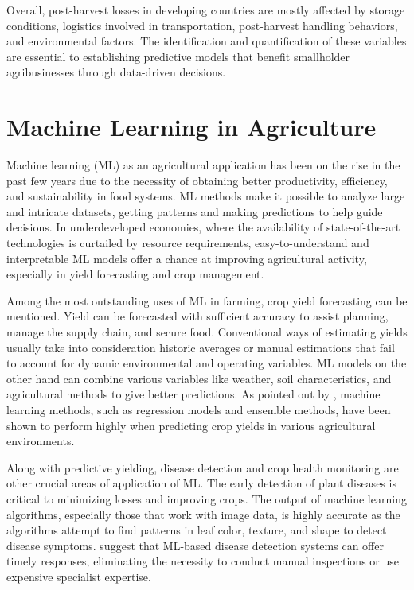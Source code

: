 Overall, post-harvest losses in developing countries are mostly affected by storage conditions,
logistics involved in transportation, post-harvest handling behaviors, and environmental factors.
The identification and quantification of these variables are essential to establishing predictive
models that benefit smallholder agribusinesses through data-driven decisions.


\section{Machine Learning in Agriculture}

Machine learning (ML) as an agricultural application has been on the rise in the past few years due
to the necessity of obtaining better productivity, efficiency, and sustainability in food systems.
ML methods make it possible to analyze large and intricate datasets, getting patterns and making
predictions to help guide decisions. In underdeveloped economies, where the availability of
state-of-the-art technologies is curtailed by resource requirements, easy-to-understand and
interpretable ML models offer a chance at improving agricultural activity, especially in yield
forecasting and crop management.

Among the most outstanding uses of ML in farming, crop yield forecasting can be mentioned. Yield
can be forecasted with sufficient accuracy to assist planning, manage the supply chain, and secure
food. Conventional ways of estimating yields usually take into consideration historic averages or
manual estimations that fail to account for dynamic environmental and operating variables. ML models
on the other hand can combine various variables like weather, soil characteristics, and agricultural
methods to give better predictions. As pointed out by \cite{jabed2024crop}, machine learning
methods, such as regression models and ensemble methods, have been shown to perform highly when
predicting crop yields in various agricultural environments.

Along with predictive yielding, disease detection and crop health monitoring are other crucial areas
of application of ML. The early detection of plant diseases is critical to minimizing losses and
improving crops. The output of machine learning algorithms, especially those that work with image
data, is highly accurate as the algorithms attempt to find patterns in leaf color, texture, and
shape to detect disease symptoms. \cite{meghraoui2024applied} suggest that ML-based disease
detection systems can offer timely responses, eliminating the necessity to conduct manual inspections
or use expensive specialist expertise.

